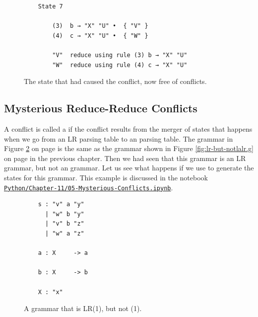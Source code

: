 \begin{figure}[!ht]
\centering
\begin{verbatim}
    State 7

        (3)  b → "X" "U" •  { "V" }
        (4)  c → "X" "U" •  { "W" }

        "V"  reduce using rule (3) b → "X" "U"
        "W"  reduce using rule (4) c → "X" "U"
\end{verbatim}
\vspace*{-0.3cm}
\caption{The state that had caused the conflict, now free of conflicts.}
\label{fig:Look-Ahead-Solved.state7}
\end{figure}
\FloatBarrier

\subsection{Mysterious Reduce-Reduce Conflicts}
A conflict is called a   if the conflict results from the merger of
states that happens when we go from an LR parsing table to an  parsing table.  The grammar in Figure
\ref{fig:Mysterious-Conflicts.ipynb} on page \pageref{fig:Mysterious-Conflicts.ipynb} is the same as the
grammar shown in Figure \ref{fig:lr-but-notlalr.g} on page \pageref{fig:lr-but-notlalr.g} in the previous
chapter.  Then we had seen that this grammar is an LR grammar, but not an  grammar.  Let us see what happens
if we use  to generate the states for this grammar.  This example is discussed in the notebook
\\[0.2cm]
\hspace*{1.3cm}
\href{https://github.com/karlstroetmann/Formal-Languages/tree/master/Python/Chapter-11/05-Mysterious-Conflicts.ipynb}{\texttt{Python/Chapter-11/05-Mysterious-Conflicts.ipynb}}.

\begin{figure}[!ht]
\centering
\begin{verbatim}
    s : "v" a "y"
      | "w" b "y"
      | "v" b "z"
      | "w" a "z"

    a : X     -> a

    b : X     -> b

    X : "x"
\end{verbatim}
\vspace*{-0.3cm}
\caption{A grammar that is LR(1), but not (1).}
\label{fig:Mysterious-Conflicts.ipynb}
\end{figure}
\vspace*{0.3cm}

